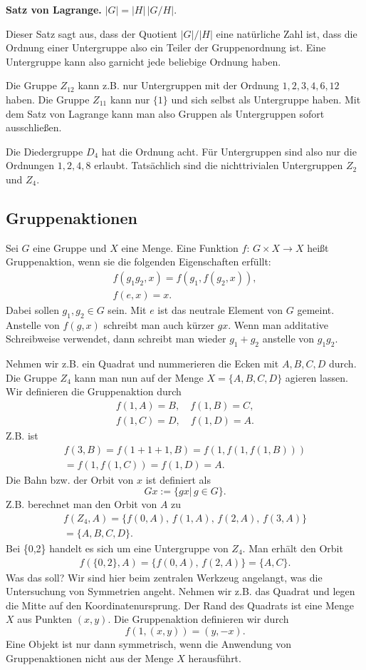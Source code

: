 \documentclass[a4paper,10pt,fleqn,twocolumn,twoside]{scrartcl}
\begin{document}
\textbf{Satz von Lagrange.} $|G|=|H|\,|G/H|$.

Dieser Satz sagt aus, dass der Quotient $|G|/|H|$ eine natürliche Zahl ist, dass die Ordnung einer Untergruppe also ein Teiler der Gruppenordnung ist. Eine Untergruppe kann also garnicht jede beliebige Ordnung haben.

Die Gruppe $Z_{12}$ kann z.B. nur Untergruppen mit der Ordnung $1,2,3,4,6,12$ haben. Die Gruppe $Z_{11}$ kann nur $\{1\}$ und sich selbst als Untergruppe haben. Mit dem Satz von Lagrange kann man also Gruppen als Untergruppen sofort ausschließen.

Die Diedergruppe $D_4$ hat die Ordnung acht. Für Untergruppen sind also nur die Ordnungen $1,2,4,8$ erlaubt. Tatsächlich sind die nichttrivialen Untergruppen $Z_2$ und $Z_4$.

\subsection{Gruppenaktionen}

Sei $G$ eine Gruppe und $X$ eine Menge. Eine Funktion $f{:}\,G\times X\rightarrow X$ heißt Gruppenaktion, wenn sie die folgenden Eigenschaften erfüllt:
\begin{gather*}
f(g_1g_2,x) = f(g_1,f(g_2,x)),\\
f(e,x) = x.
\end{gather*}
Dabei sollen $g_1,g_2\in G$ sein. Mit $e$ ist das neutrale Element von $G$ gemeint. Anstelle von $f(g,x)$ schreibt man auch kürzer $gx$. Wenn man additative Schreibweise verwendet, dann schreibt man wieder $g_1+g_2$ anstelle von $g_1g_2$.

Nehmen wir z.B. ein Quadrat und nummerieren die Ecken mit $A,B,C,D$ durch. Die Gruppe $Z_4$ kann man nun auf der Menge $X=\{A,B,C,D\}$ agieren lassen. Wir definieren die Gruppenaktion durch
\begin{gather*}
f(1,A)=B,\quad f(1,B)=C,\\
f(1,C)=D,\quad f(1,D)=A.
\end{gather*}
%
Z.B. ist
\begin{gather*}
f(3,B) = f(1+1+1,B) = f(1,f(1,f(1,B)))\\
= f(1,f(1,C)) = f(1,D) = A.
\end{gather*}
%
Die Bahn bzw. der Orbit von $x$ ist definiert als
\[Gx := \{gx|\,g\in G\}.\]
Z.B. berechnet man den Orbit von $A$ zu
\begin{gather*}
f(Z_4,A) = \{f(0,A),\,f(1,A),\,f(2,A),\,f(3,A)\}\\
= \{A,B,C,D\}.
\end{gather*}
Bei \{0,2\} handelt es sich um eine Untergruppe von $Z_4$. Man erhält den Orbit
\begin{gather*}
f(\{0,2\},A) = \{f(0,A),\,f(2,A)\} = \{A,C\}.
\end{gather*}
%
Was das soll? Wir sind hier beim zentralen Werkzeug angelangt, was die Untersuchung von Symmetrien angeht. Nehmen wir z.B. das Quadrat und legen die Mitte auf den Koordinatenursprung. Der Rand des Quadrats ist eine Menge $X$ aus Punkten $(x,y)$. Die Gruppenaktion definieren wir durch
\[f(1,(x,y)) = (y,-x).\]
Eine Objekt ist nur dann symmetrisch, wenn die Anwendung von Gruppenaktionen nicht aus der Menge $X$ herausführt.
\end{document}
